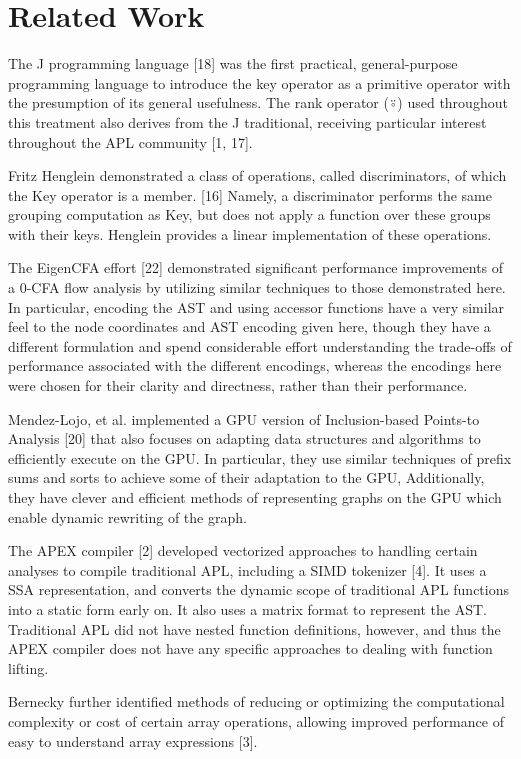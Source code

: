 \documentclass[pldi]{sigplanconf-pldi15}
\begin{document}
\section{Related Work}

The J programming language [18] was the first practical, general-purpose programming language 
to introduce the key operator as a primitive operator with the presumption of its general 
usefulness. The rank operator (⍤) used throughout this treatment also derives from the J 
traditional, receiving particular interest throughout the APL community [1, 17]. 

Fritz Henglein demonstrated a class of operations, called discriminators, of which the Key operator 
is a member. [16] Namely, a discriminator performs the same grouping computation as Key, but does 
not apply a function over these groups with their keys. Henglein provides a linear implementation 
of these operations. 

The EigenCFA effort [22] demonstrated significant performance improvements of a 0-CFA flow 
analysis by utilizing similar techniques to those demonstrated here. In particular, encoding the 
AST and using accessor functions have a very similar feel to the node coordinates and AST 
encoding given here, though they have a different formulation and spend considerable effort 
understanding the trade-offs of performance associated with the different encodings, whereas 
the encodings here were chosen for their clarity and directness, rather than their performance. 

Mendez-Lojo, et al. implemented a GPU version of Inclusion-based Points-to Analysis [20] that also 
focuses on adapting data structures and algorithms to efficiently execute on the GPU. In particular, 
they use similar techniques of prefix sums and sorts to achieve some of their adaptation to the GPU, 
Additionally, they have clever and efficient methods of representing graphs on the GPU which enable 
dynamic rewriting of the graph. 

The APEX compiler [2] developed vectorized approaches to handling certain analyses to compile 
traditional APL, including a SIMD tokenizer [4]. It uses a SSA representation, and converts the
dynamic scope of traditional APL functions into a static form early on. It also uses a matrix 
format to represent the AST. Traditional APL did not have nested function definitions, however, 
and thus the APEX compiler does not have any specific approaches to dealing with function lifting.

Bernecky further identified methods of reducing or optimizing the computational complexity or cost 
of certain array operations, allowing improved performance of easy to understand array expressions [3].
\end{document}
